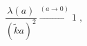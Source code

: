 \begin{equation}
\frac{\lambda (a)}{ ( \tilde{k} a )^{2}} 
 \stackrel{(a \rightarrow 0)}{\rightarrow}
 1
\; ,
\end{equation}

